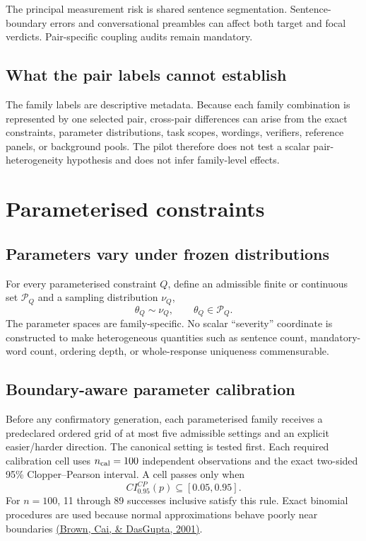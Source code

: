 \documentclass[11pt,a4paper]{article}
\begin{document}
The principal measurement risk is shared sentence segmentation. Sentence-boundary errors and conversational preambles can affect both target and focal verdicts. Pair-specific coupling audits remain mandatory.

\subsection{What the pair labels cannot establish}

The family labels are descriptive metadata. Because each family combination is represented by one selected pair, cross-pair differences can arise from the exact constraints, parameter distributions, task scopes, wordings, verifiers, reference panels, or background pools. The pilot therefore does not test a scalar pair-heterogeneity hypothesis and does not infer family-level effects.

\section{Parameterised constraints}

\subsection{Parameters vary under frozen distributions}
For every parameterised constraint $Q$, define an admissible finite or continuous set $\mathcal P_Q$ and a sampling distribution $\nu_Q$,
\[
\theta_Q\sim\nu_Q,\qquad \theta_Q\in\mathcal P_Q.
\]
The parameter spaces are family-specific. No scalar ``severity'' coordinate is constructed to make heterogeneous quantities such as sentence count, mandatory-word count, ordering depth, or whole-response uniqueness commensurable.

\subsection{Boundary-aware parameter calibration}
Before any confirmatory generation, each parameterised family receives a predeclared ordered grid of at most five admissible settings and an explicit easier/harder direction. The canonical setting is tested first. Each required calibration cell uses $n_{\rm cal}=100$ independent observations and the exact two-sided 95\% Clopper--Pearson interval. A cell passes only when
\[
CI^{CP}_{0.95}(p)\subseteq[0.05,0.95].
\]
For $n=100$, 11 through 89 successes inclusive satisfy this rule. Exact binomial procedures are used because normal approximations behave poorly near boundaries \href{https://www.stat.purdue.edu/~dasgupta/publications/tr99-19.pdf}{(Brown, Cai, \& DasGupta, 2001)}.
\end{document}
